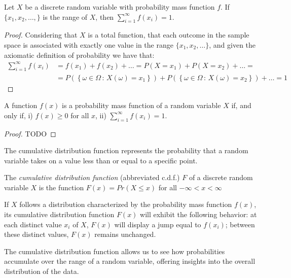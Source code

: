 \begin{proposition}
Let $X$ be a discrete random variable with probability mass function $f$. If $\{ x_1, x_2, \ldots, \}$ is the range of $X$, then $\sum_{i=1}^{\infty}f\left(x_{i}\right)=1$.
\end{proposition}
\begin{proof}
Considering that $X$ is a total function, that each outcome in the sample space is associated with exactly one value in the range $\{ x_1, x_2, \ldots \}$, and given the axiomatic definition of probability we have that:
\begin{equation*}
\begin{split}
\sum_{i=1}^{\infty} f(x_i) & = f(x_1) + f(x_2) + \ldots = P\left( X = x_1 \right) + P\left( X = x_2 \right) + \ldots = \\
&  = P \left( \left\{ \omega \in \Omega \,:\, X \left( \omega \right) = x_1 \right\} \right) + P \left( \left\{ \omega \in \Omega \,:\, X \left( \omega \right) = x_2 \right\} \right) + \ldots = 1 
\end{split}
\end{equation*}
\end{proof}

{\color{red}
\begin{proposition}
A function $f(x)$ is a probability mass function of a random variable $X$ if, and only if, i) $f(x) \geq 0$ for all $x$, ii) $\sum_{i=1}^{\infty} f(x_i) = 1$.
\end{proposition}
\begin{proof}
TODO
\end{proof}
}

The cumulative distribution function represents the probability that a random variable takes on a value less than or equal to a specific point.

\begin{definition}
The \emph{cumulative distribution function} (abbreviated c.d.f.) $F$ of a discrete random variable $X$ is the function $F(x)=Pr(X\leq x)$ for all $-\infty < x < \infty$
\end{definition}

If $X$ follows a distribution characterized by the probability mass function $f(x)$, its cumulative distribution function $F(x)$ will exhibit the following behavior: at each distinct value $x_i$ of $X$, $F(x)$ will display a jump equal to $f(x_i)$; between these distinct values, $F(x)$ remains unchanged.

The cumulative distribution function allows us to see how probabilities accumulate over the range of a random variable, offering insights into the overall distribution of the data.


